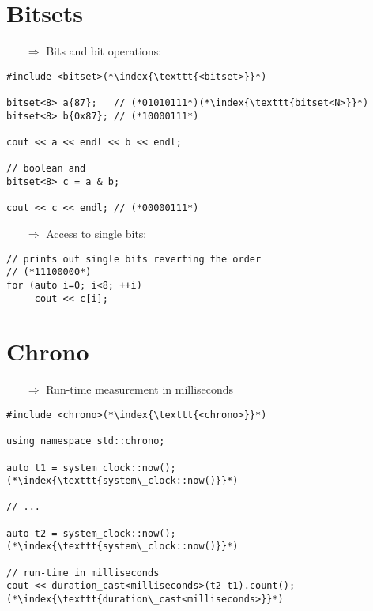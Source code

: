 \documentclass[10pt]{article}
\begin{document}
\section{Bitsets}
\small
\begin{enumerate}
\item[$\Rightarrow$] Bits and bit operations:
\end{enumerate}
\begin{lstlisting}
#include <bitset>(*\index{\texttt{<bitset>}}*)

bitset<8> a{87};   // (*01010111*)(*\index{\texttt{bitset<N>}}*)
bitset<8> b{0x87}; // (*10000111*)
    
cout << a << endl << b << endl;
    
// boolean and
bitset<8> c = a & b;
    
cout << c << endl; // (*00000111*)
\end{lstlisting}
\begin{enumerate}
\item[$\Rightarrow$] Access to single bits:
\end{enumerate}
\begin{lstlisting}
// prints out single bits reverting the order
// (*11100000*)
for (auto i=0; i<8; ++i)
     cout << c[i];
\end{lstlisting}
%
%
\section{Chrono}
\small
\begin{enumerate}
\item[$\Rightarrow$] Run-time measurement in milliseconds
\end{enumerate}
\begin{lstlisting}
#include <chrono>(*\index{\texttt{<chrono>}}*)

using namespace std::chrono;

auto t1 = system_clock::now();(*\index{\texttt{system\_clock::now()}}*)

// ...

auto t2 = system_clock::now();(*\index{\texttt{system\_clock::now()}}*)

// run-time in milliseconds
cout << duration_cast<milliseconds>(t2-t1).count();(*\index{\texttt{duration\_cast<milliseconds>}}*)
\end{lstlisting}
%
%
%
\end{document}
